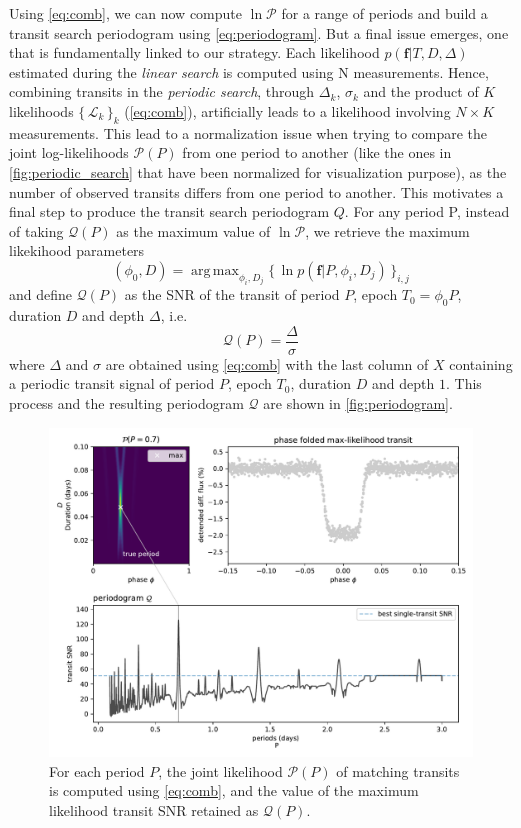 \documentclass{aastex631}
\DeclareMathOperator*{\argmax}{arg\,max}
\newcommand{\set}[1]{\{\,#1\,\}}
\begin{document}
Using \autoref{eq:comb}, we can now compute $\ln\mathcal{P}$ for a range of periods and build a transit search periodogram using \autoref{eq:periodogram}. But a final issue emerges, one that is fundamentally linked to our strategy. Each likelihood $p(\bm{f} \vert T, D, \Delta)$ estimated during the \textit{linear search} is computed using N measurements. Hence, combining transits in the \textit{periodic search}, through $\Delta_k$, $\sigma_k$ and the product of $K$ likelihoods $\set{\mathcal{L}_k}_k$ (\autoref{eq:comb}), artificially leads to a likelihood involving $N\times K$ measurements. This lead to a normalization issue when trying to compare the joint log-likelihoods $\mathcal{P}(P)$ from one period to another (like the ones in \autoref{fig:periodic_search} that have been normalized for visualization purpose), as the number of observed transits differs from one period to another. This motivates a final step to produce the transit search periodogram $Q$. For any period P, instead of taking $ \mathcal{Q}(P)$ as the maximum value of $\ln\mathcal{P}$, we retrieve the maximum likekihood parameters
\begin{equation}\label{eq:phi0}
    (\phi_0 ,D) = \argmax_{\phi_i, D_j} \set{\ln p(\bm{f} \vert P, \phi_i, D_j)}_{i, j}
\end{equation}
and define $\mathcal{Q}(P)$ as the SNR of the transit of period $P$, epoch $T_0 = \phi_0 P$, duration $D$ and depth $\Delta$, i.e.
$$
    \mathcal{Q}(P) = \frac{\Delta}{\sigma}
$$
where $\Delta$ and $\sigma$ are obtained using \autoref{eq:comb} with the last column of $X$ containing a periodic transit signal of period $P$, epoch $T_0$, duration $D$ and depth $1$. This process and the resulting periodogram $\mathcal{Q}$ are shown in \autoref{fig:periodogram}.

\begin{figure}[H]
    \begin{centering}
        \includegraphics[width=0.8\linewidth]{../figures/principle_Q.pdf}
        \caption{For each period $P$, the joint likelihood $\mathcal{P}(P)$ of matching transits is computed using \autoref{eq:comb}, and the value of the maximum likelihood transit SNR retained as $\mathcal{Q}(P)$.}
        \label{fig:periodogram}
    \end{centering}
\end{figure}
\end{document}
